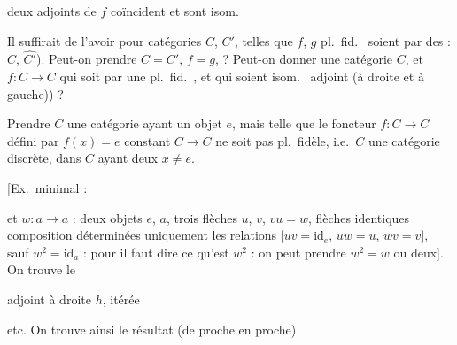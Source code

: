 \documentclass[11pt,a4paper]{article}
\begin{document}

\ill{} deux adjoints de $f$ coïncident et sont isom.

Il suffirait de l'avoir pour  catégories \struck{\ill{}} $C$,
$C'$, telles que $f$, $g$ \ill{} pl.\ fid.\ \ill{} soient \ill{} par des
 \ill{} : $\widehat{C}$, $\widehat{C'}$). Peut-on \ill{}
prendre $C = C'$, $f = g$, \ill{} ? Peut-on \ill{} donner une catégorie $C$, et
\ill{} $f : C \to C$ qui \ill{} soit \ill{} par une \ill{} pl.\ fid.\ \ill{},
et qui soient isom.\ \ill{} adjoint (à droite et à gauche)) ?

Prendre $C$ une catégorie ayant un objet $e$, mais telle que le foncteur
$f : C \to C$ défini par $f(x) = e$ \ill{} constant \ill{} $C \to C$ ne soit
pas pl.\ fidèle, i.e.\ $C$ \ill{} une catégorie discrète, dans $C$ ayant deux
\ill{} $x \neq e$.

[Ex.\ minimal :


et $w : a \to a$ : deux objets $e$, $a$, trois flèches $u$, $v$, $vu = w$,
\ill{} flèches identiques \ill{} composition \ill{} déterminées uniquement
\ill{} les relations $[uv = \mathrm{id}_{e}$, $uw = u$, $wv = v]$, sauf
\ill{} $w^{2} = \mathrm{id}_{a}$ \ill{} : pour \ill{} il faut dire ce qu'est
$w^{2}$ : on peut prendre $w^{2} = w$ \ill{} ou deux]. On trouve le \ill{}


adjoint à droite $h$,  itérée


etc. On trouve ainsi le résultat (de proche en proche)
\end{document}

